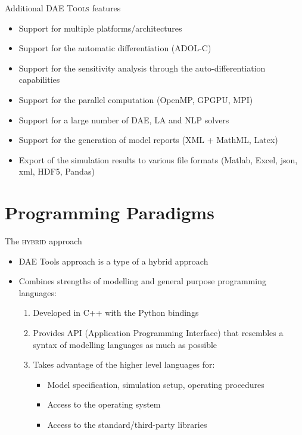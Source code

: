 \documentclass[compress,newPxFont,sthlmFooter]{beamer}
\begin{document}
\begin{frame}{Additional \textsc{DAE Tools} features}
    \begin{itemize}
        \item Support for \alert{multiple platforms/architectures} 
        \item Support for the \alert{automatic differentiation} (ADOL-C)
        \item Support for the \alert{sensitivity analysis} through the auto-differentiation capabilities
        \item Support for the \alert{parallel} computation (OpenMP, GPGPU, MPI)
        \item Support for a large number of \alert{DAE}, \alert{LA} and \alert{NLP} solvers 
        \item Support for the generation of \alert{model reports} (XML + MathML, Latex)
        \item \alert{Export} of the \alert{simulation results} to various file formats (Matlab, Excel, json, xml, HDF5, Pandas)
    \end{itemize}
\end{frame}

\section{Programming Paradigms}

\begin{frame}{The \textsc{hybrid} approach}
  \begin{itemize}
    \item DAE Tools approach is a \alert{type of a hybrid approach}
    \item Combines strengths of \alert{modelling} and \alert{general purpose} programming languages:
        \begin{enumerate}
            \item \alert{Developed in C++} with the \alert{Python bindings}
            \item Provides \alert{API} (Application Programming Interface) that \alert{resembles a syntax of modelling languages}
                  as much as possible
            \item \alert{Takes advantage of the higher level languages} for:
                \begin{itemize}
                    \item Model specification, simulation setup, operating procedures
                    \item Access to the operating system 
                    \item Access to the standard/third-party libraries
                \end{itemize}
        \end{enumerate}
  \end{itemize}
\end{frame}
\end{document}
